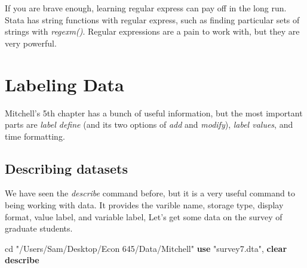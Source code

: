 \documentclass[
]{book}
\newenvironment{Shaded}{\begin{snugshade}}{\end{snugshade}}
\newcommand{\KeywordTok}[1]{\textcolor[rgb]{0.13,0.29,0.53}{\textbf{#1}}}
\newcommand{\NormalTok}[1]{#1}
\newcommand{\StringTok}[1]{\textcolor[rgb]{0.31,0.60,0.02}{#1}}
\begin{document}
If you are brave enough, learning regular express can pay off in the long run. Stata has string functions with regular express, such as finding particular sets of strings with \emph{regexm()}. Regular expressions are a pain to work with, but they are very powerful.

\chapter{Labeling Data}\label{labeling-data}

Mitchell's 5th chapter has a bunch of useful information, but the most
important parts are \emph{label define} (and its two options of \emph{add} and \emph{modify}), \emph{label values}, and time formatting.

\section{Describing datasets}\label{describing-datasets}

We have seen the \emph{describe} command before, but it is a very useful command to being working with data. It provides the varible name, storage type, display format, value label, and variable label, Let's get some data on the survey of graduate students.

\begin{Shaded}
\begin{Highlighting}[]
\NormalTok{cd }\StringTok{"/Users/Sam/Desktop/Econ 645/Data/Mitchell"}
\KeywordTok{use} \StringTok{"survey7.dta"}\NormalTok{, }\KeywordTok{clear}
\KeywordTok{describe}
\end{Highlighting}
\end{Shaded}
\end{document}
